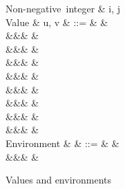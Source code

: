 \begin{figure}[H]
\begin{syntaxfig}
\mbox{Non-negative integer}
&
i, j
\\[2mm]
\mbox{Value}
&
u, v
&
::=
&
\hole
&
\\
&&&
\annTrue{\alpha} \mid \annFalse{\alpha}
&
\\
&&&
&
\\
&&&
&
\\
&&&
\annNil{\alpha}
&
\\
&&&
&
\\
&&&
&
\\
&&&
\exPrim{\phi}
&
\\
&&&
&
\\[2mm]
\mbox{Environment}
&
\rho
&
::=
&
\envEmpty
&
\\
&&&
&
\end{syntaxfig}
\caption{Values and environments}
\end{figure}
